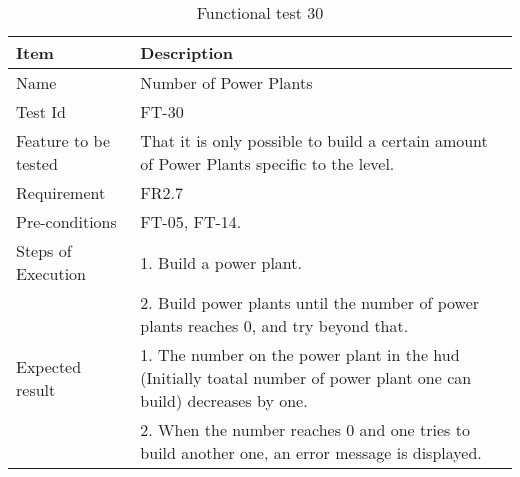 \begin{table}[H]
\centering
	\begin{tabular}{ l | p{8cm} }
		\hline
		{\bf Item} & {\bf Description} \\ \hline
		Name & Number of Power Plants \\ 
		Test Id & FT-30 \\ 
		Feature to be tested & That it is only possible to build a certain amount of Power Plants specific to the level. \\ 
		Requirement & FR2.7 \\ 
		Pre-conditions & FT-05, FT-14. \\ 
		Steps of Execution & 1. Build a power plant. \\ 
		& 2. Build power plants until the number of power plants reaches 0, and try beyond that. \\
		Expected result & 1. The number on the power plant in the hud (Initially toatal number of power plant one can build) decreases by one. \\
		& 2. When the number reaches 0 and one tries to build another one, an error message is displayed. \\
	\end{tabular}
	\caption{Functional test 30}
\end{table}